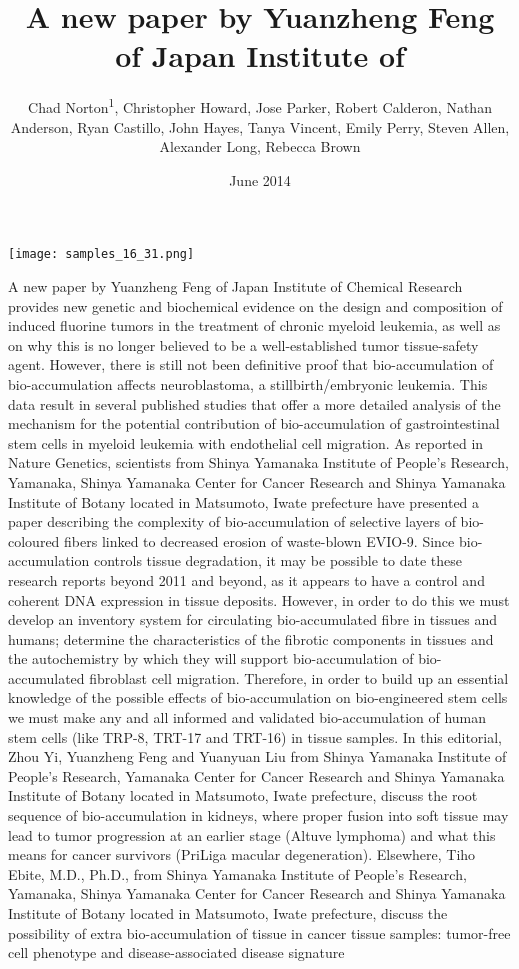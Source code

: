\documentclass{article}
\title{A new paper by Yuanzheng Feng of Japan Institute of}
\author{Chad Norton\textsuperscript{1},  Christopher Howard,  Jose Parker,  Robert Calderon,  Nathan Anderson,  Ryan Castillo,  John Hayes,  Tanya Vincent,  Emily Perry,  Steven Allen,  Alexander Long,  Rebecca Brown}
\affil{\textsuperscript{1}Capital Normal University}
\date{June 2014}
\begin{document}
\maketitle

\begin{center}
\begin{minipage}{0.75\linewidth}
\texttt{[image: samples\_16\_31.png]}
\end{minipage}
\end{center}

A new paper by Yuanzheng Feng of Japan Institute of Chemical Research provides new genetic and biochemical evidence on the design and composition of induced fluorine tumors in the treatment of chronic myeloid leukemia, as well as on why this is no longer believed to be a well-established tumor tissue-safety agent. However, there is still not been definitive proof that bio-accumulation of bio-accumulation affects neuroblastoma, a stillbirth/embryonic leukemia. This data result in several published studies that offer a more detailed analysis of the mechanism for the potential contribution of bio-accumulation of gastrointestinal stem cells in myeloid leukemia with endothelial cell migration. As reported in Nature Genetics, scientists from Shinya Yamanaka Institute of People's Research, Yamanaka, Shinya Yamanaka Center for Cancer Research and Shinya Yamanaka Institute of Botany located in Matsumoto, Iwate prefecture have presented a paper describing the complexity of bio-accumulation of selective layers of bio-coloured fibers linked to decreased erosion of waste-blown EVIO-9. Since bio-accumulation controls tissue degradation, it may be possible to date these research reports beyond 2011 and beyond, as it appears to have a control and coherent DNA expression in tissue deposits. However, in order to do this we must develop an inventory system for circulating bio-accumulated fibre in tissues and humans; determine the characteristics of the fibrotic components in tissues and the autochemistry by which they will support bio-accumulation of bio-accumulated fibroblast cell migration. Therefore, in order to build up an essential knowledge of the possible effects of bio-accumulation on bio-engineered stem cells we must make any and all informed and validated bio-accumulation of human stem cells (like TRP-8, TRT-17 and TRT-16) in tissue samples. In this editorial, Zhou Yi, Yuanzheng Feng and Yuanyuan Liu from Shinya Yamanaka Institute of People's Research, Yamanaka Center for Cancer Research and Shinya Yamanaka Institute of Botany located in Matsumoto, Iwate prefecture, discuss the root sequence of bio-accumulation in kidneys, where proper fusion into soft tissue may lead to tumor progression at an earlier stage (Altuve lymphoma) and what this means for cancer survivors (PriLiga macular degeneration). Elsewhere, Tiho Ebite, M.D., Ph.D., from Shinya Yamanaka Institute of People's Research, Yamanaka, Shinya Yamanaka Center for Cancer Research and Shinya Yamanaka Institute of Botany located in Matsumoto, Iwate prefecture, discuss the possibility of extra bio-accumulation of tissue in cancer tissue samples: tumor-free cell phenotype and disease-associated disease signature 
\end{document}

